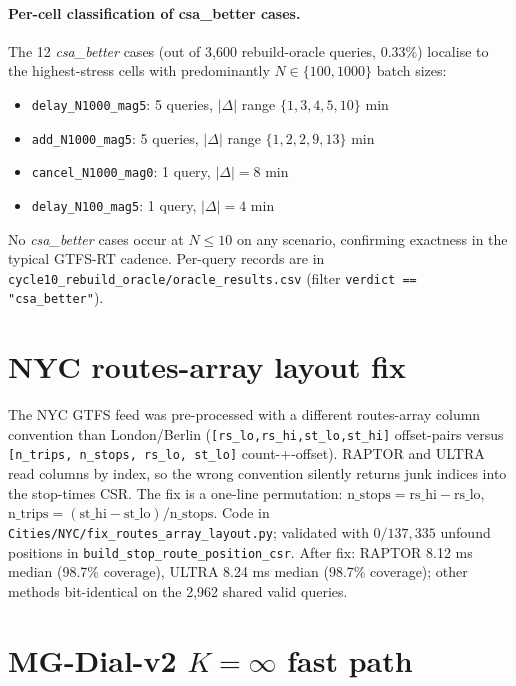 \documentclass[letterpaper]{article}
\begin{document}
\paragraph{Per-cell classification of csa\_better cases.}
The 12 \emph{csa\_better} cases (out of 3{,}600 rebuild-oracle queries,
$0.33\%$) localise to the highest-stress cells with predominantly
$N \in \{100, 1000\}$ batch sizes:
\begin{itemize}
\item \texttt{delay\_N1000\_mag5}: 5 queries, $|\Delta|$ range
$\{1, 3, 4, 5, 10\}$ min
\item \texttt{add\_N1000\_mag5}: 5 queries, $|\Delta|$ range
$\{1, 2, 2, 9, 13\}$ min
\item \texttt{cancel\_N1000\_mag0}: 1 query, $|\Delta|=8$ min
\item \texttt{delay\_N100\_mag5}: 1 query, $|\Delta|=4$ min
\end{itemize}
No \emph{csa\_better} cases occur at $N \leq 10$ on any scenario,
confirming exactness in the typical GTFS-RT cadence. Per-query records
are in \texttt{cycle10\_rebuild\_oracle/oracle\_results.csv} (filter
\texttt{verdict == "csa\_better"}).

\section{NYC routes-array layout fix}
\label{app:nyc-fix}

The NYC GTFS feed was pre-processed with a different routes-array
column convention than London/Berlin
(\texttt{[rs\_lo,rs\_hi,st\_lo,st\_hi]} offset-pairs versus
\texttt{[n\_trips, n\_stops, rs\_lo, st\_lo]} count-+-offset). RAPTOR
and ULTRA read columns by index, so the wrong convention silently
returns junk indices into the stop-times CSR. The fix is a one-line
permutation:
$\text{n\_stops}=\text{rs\_hi}-\text{rs\_lo}$,
$\text{n\_trips}=(\text{st\_hi}-\text{st\_lo})/\text{n\_stops}$.
Code in \texttt{Cities/NYC/fix\_routes\_array\_layout.py}; validated
with $0/137{,}335$ unfound positions in
\texttt{build\_stop\_route\_position\_csr}. After fix: RAPTOR 8.12 ms
median (98.7\% coverage), ULTRA 8.24 ms median (98.7\% coverage); other
methods bit-identical on the 2{,}962 shared valid queries.

\section{MG-Dial-v2 $K\!=\!\infty$ fast path}
\label{app:mgdial-fix}
\end{document}
